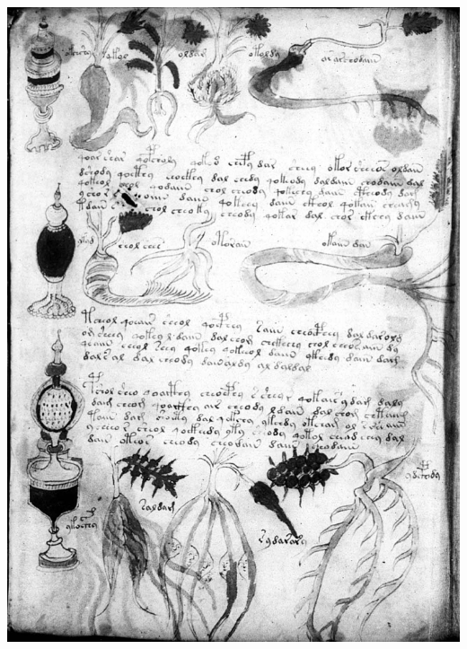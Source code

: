 \documentclass[a4paper,7pt]{jsarticle}
\begin{document}
\includegraphics[width=15cm]{f89r1.jpg}
\end{document}
